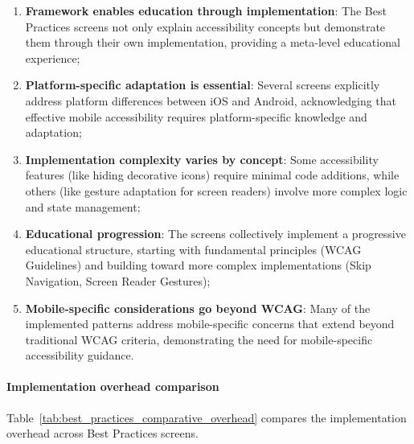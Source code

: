 \begin{enumerate}
    \item \textbf{Framework enables education through implementation}: The Best Practices screens not only explain accessibility concepts but demonstrate them through their own implementation, providing a meta-level educational experience;
    
    \item \textbf{Platform-specific adaptation is essential}: Several screens explicitly address platform differences between iOS and Android, acknowledging that effective mobile accessibility requires platform-specific knowledge and adaptation;
    
    \item \textbf{Implementation complexity varies by concept}: Some accessibility features (like hiding decorative icons) require minimal code additions, while others (like gesture adaptation for screen readers) involve more complex logic and state management;
    
    \item \textbf{Educational progression}: The screens collectively implement a progressive educational structure, starting with fundamental principles (WCAG Guidelines) and building toward more complex implementations (Skip Navigation, Screen Reader Gestures);
    
    \item \textbf{Mobile-specific considerations go beyond WCAG}: Many of the implemented patterns address mobile-specific concerns that extend beyond traditional WCAG criteria, demonstrating the need for mobile-specific accessibility guidance.
\end{enumerate}

\paragraph{Implementation overhead comparison}

Table~\ref{tab:best_practices_comparative_overhead} compares the implementation overhead across Best Practices screens.

